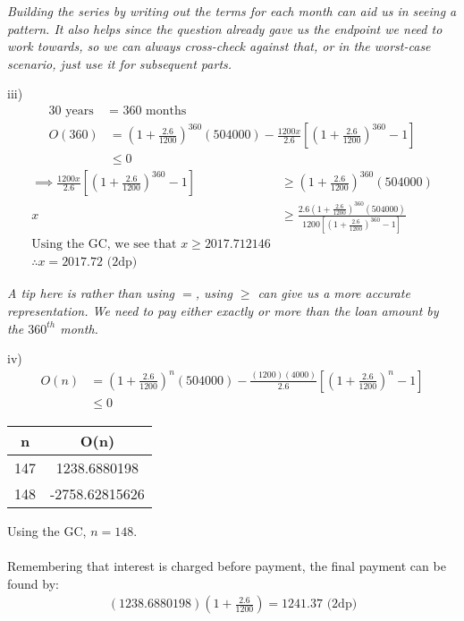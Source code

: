 \documentclass[12pt, a4paper, titlepage]{article}
\begin{document}
\emph{Building the series by writing out the terms for each month can aid us in seeing a pattern. It also helps since the question already gave us the endpoint we need to work towards, so we can always cross-check against that, or in the worst-case scenario, just use it for subsequent parts.}

iii)
\begin{align*}
    \text{30 years } &= \text{ 360 months} \\
    O(360) &= (1 + \frac{2.6}{1200})^{360}(504000) - \frac{1200x}{2.6}[(1 + \frac{2.6}{1200})^{360} - 1] \\
    &\leq 0
\end{align*}
\begin{align*}
    \implies \frac{1200x}{2.6}[(1 + \frac{2.6}{1200})^{360} - 1] &\ge (1 + \frac{2.6}{1200})^{360}(504000) \\
    x &\ge \frac{2.6(1 + \frac{2.6}{1200})^{360}(504000)}{1200[(1 + \frac{2.6}{1200})^{360} - 1]} \\
    \text{Using the GC, we see that } x \ge 2017.712146 \\
    \therefore x = 2017.72 \text{ (2dp)}
\end{align*}

\emph{A tip here is rather than using $=$, using $\ge$ can give us a more accurate representation. We need to pay either exactly or more than the loan amount by the $360^{th}$ month.}

iv)
\begin{align*}
    O(n) &= (1 + \frac{2.6}{1200})^n(504000) - \frac{(1200)(4000)}{2.6}[(1 + \frac{2.6}{1200})^n - 1] \\
    &\leq 0
\end{align*}

\begin{minipage}{0.4\textwidth} %
    \begin{tabular}{c|c}
        n & O(n) \\
        \hline
        147 & 1238.6880198 \\
        \hline
        148 & -2758.62815626 \\
    \end{tabular}
\end{minipage}
Using the GC, $n = 148$. \\ \\
Remembering that interest is charged before payment, the final payment can be found by:
\begin{align*}
    (1238.6880198)(1 + \frac{2.6}{1200}) = 1241.37 \text{ (2dp)}
\end{align*}
\end{document}
